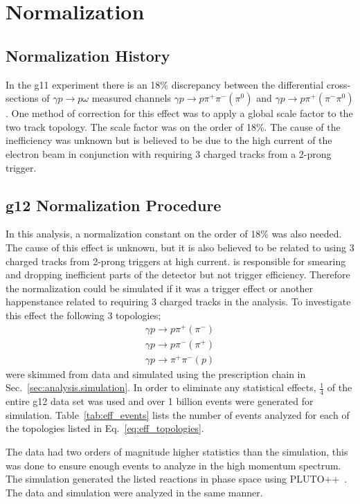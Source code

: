 \section{Normalization}\label{sec:results.normalization}
\subsection{Normalization History}
In the g11 experiment there is an 18\% discrepancy between the differential cross-sections of $\gamma p \rightarrow p \omega$ measured channels $\gamma p \rightarrow p \pi^+ \pi^- (\pi^0)$ and $\gamma p \rightarrow p \pi^+ (\pi^- \pi^0)$. One method of correction for this effect was to apply a global scale factor to the two track topology. The scale factor was on the order of 18\%. The cause of the inefficiency was unknown but is believed to be due to the high current of the electron beam in conjunction with requiring 3 charged tracks from a 2-prong trigger.
\subsection{g12 Normalization Procedure}
In this analysis, a normalization constant on the order of 18\% was also needed. The cause of this effect is unknown, but it is also believed to be related to using 3 charged tracks from 2-prong triggers at high current.  is responsible for smearing and dropping inefficient parts of the detector but not trigger efficiency. Therefore the normalization could be simulated if it was a trigger effect or another happenstance related to requiring 3 charged tracks in the analysis. To investigate this effect the following 3 topologies; 
\begin{align}\label{eq:eff_topologies}
\gamma p \rightarrow p \pi^+ (\pi^-) \nonumber\\
\gamma p \rightarrow p \pi^- (\pi^+)  \nonumber\\
\gamma p \rightarrow \pi^+ \pi^- (p)
\end{align}  
were skimmed from data and simulated using the prescription chain in Sec.~\ref{sec:analysis.simulation}. In order to eliminate any statistical effects, $\frac{1}{4}$ of the entire g12 data set was used and over 1 billion events were generated for simulation. Table~\ref{tab:eff_events} lists the number of events analyzed for each of the topologies listed in Eq.~\ref{eq:eff_topologies}.

The data had two orders of magnitude higher statistics than the simulation, this was done to ensure enough events to analyze in the high momentum spectrum. The simulation generated the listed reactions in phase space using PLUTO++~\cite{PLUTO}. The data and simulation were analyzed in the same manner.

